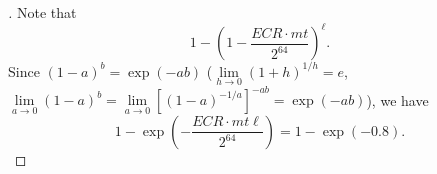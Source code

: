 \begin{enumerate}[\bf 1.]
\begin{figure}[h!]
	\end{figure}
	\begin{proof}[\sol]
		Note that \[
		\displaystyle 1-\left(1-\frac{ECR\cdot mt}{2^{64}}\right)^{\ell}.
		\] Since $(1-a)^b=\exp(-ab)$ ($\lim\limits_{h\to 0}(1+h)^{1/h}=e$, $\lim\limits_{a\to 0}(1-a)^b=\lim\limits_{a\to 0}[(1-a)^{-1/a}]^{-ab}=\exp(-ab)$), we have \[
		1-\exp(-\frac{ECR\cdot mt\ell}{2^{64}})=1-\exp(-0.8).
		\]
	\end{proof}
\end{enumerate}